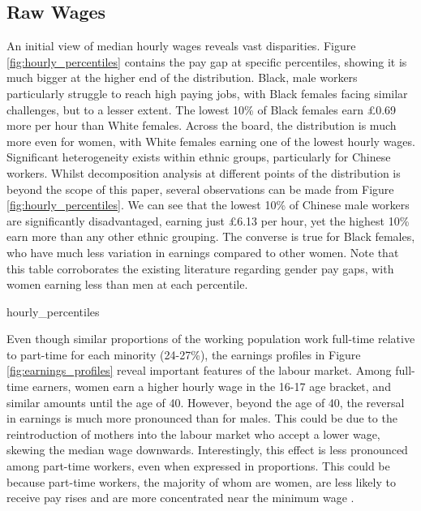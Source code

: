\documentclass[class=article, crop=false]{standalone}
\begin{document}

\subsection{Raw Wages}
\label{sec:Wages}
An initial view of median hourly wages reveals vast disparities. Figure \ref{fig:hourly_percentiles} contains the pay gap at specific percentiles, showing it is much bigger at the higher end of the distribution. Black, male workers particularly struggle to reach high paying jobs, with Black females facing similar challenges, but to a lesser extent. The lowest 10\% of Black females earn £0.69 more per hour than White females. Across the board, the distribution is much more even for women, with White females earning one of the lowest hourly wages. Significant heterogeneity exists within ethnic groups, particularly for Chinese workers. Whilst decomposition analysis at different points of the distribution is beyond the scope of this paper, several observations can be made from Figure \ref{fig:hourly_percentiles}. We can see that the lowest 10\% of Chinese male workers are significantly disadvantaged, earning just £6.13 per hour, yet the highest 10\% earn more than any other ethnic grouping. The converse is true for Black females, who have much less variation in earnings compared to other women. Note that this table corroborates the existing literature regarding gender pay gaps, with women earning less than men at each percentile.

{hourly_percentiles}
\doublespacing

Even though similar proportions of the working population work full-time relative to part-time for each minority (24-27\%), the earnings profiles in Figure \ref{fig:earnings_profiles} reveal important features of the labour market. Among full-time earners, women earn a higher hourly wage in the 16-17 age bracket, and similar amounts until the age of 40. However, beyond the age of 40, the reversal in earnings is much more pronounced than for males. This could be due to the reintroduction of mothers into the labour market who accept a lower wage, skewing the median wage downwards. Interestingly, this effect is less pronounced among part-time workers, even when expressed in proportions. This could be because part-time workers, the majority of whom are women, are less likely to receive pay rises and are more concentrated near the minimum wage \citep{IFS, ONSi}.
\end{document}
